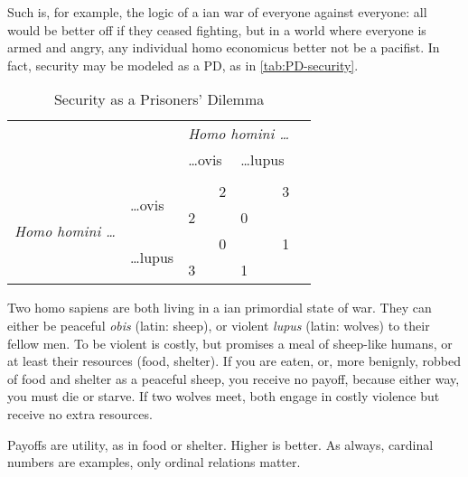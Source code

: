Such is, for example, the logic of a \citeauthor{Hobbes-1651-aa}ian war of everyone against everyone: all would be better off if they ceased fighting, but in a world where everyone is armed and angry, any individual homo economicus better not be a pacifist.
In fact, security may be modeled as a \gls{PD}, as in \autoref{tab:PD-security}.

\begin{table}
	\caption{Security as a Prisoners' Dilemma}
	\label{tab:PD-security}
	\begin{center}
	\begin{tabular}
		{m{1cm}
		m{}
		m{}
		m{}
		m{}}

&
& \multicolumn{2}{c}{\emph{Homo homini \ldots}}
\\


&
&\ldots ovis
& \ldots lupus
\\\\ %

\cline{3-4}


\multicolumn{1}{c}{\multirow{4}{*}{\emph{Homo homini \ldots}}}
& \multirow{2}{2,3cm}{\ldots ovis}
& 	\multicolumn{1}{|r|}{2}
& \multicolumn{1}{r|}{3}
\\


\multicolumn{1}{c}{}
& \multicolumn{1}{c}{}
& \multicolumn{1}{|l|}{2}
& \multicolumn{1}{l|}{0}
\\

\cline{3-4}

\multicolumn{1}{c}{}
& \multirow{2}{2,3cm}{\ldots lupus}
& \multicolumn{1}{|r|}{0}
& \multicolumn{1}{r|}{1}
\\


\multicolumn{1}{c}{}
& \multicolumn{1}{c}{}
& \multicolumn{1}{|l|}{3}
& \multicolumn{1}{l|}{1}
\\

\cline{3-4}
\end{tabular}
\end{center}
\scriptsize{
	Two homo sapiens are both living in a \citeauthor{Hobbes-1651-aa}ian primordial state of war.
	They can either be peaceful \emph{obis} (latin: sheep), or violent \emph{lupus} (latin: wolves) to their fellow men.
	To be violent is costly, but promises a meal of sheep-like humans, or at least their resources (food, shelter).
	If you are eaten, or, more benignly, robbed of food and shelter as a peaceful sheep, you receive no payoff, because either way, you must die or starve.
	If two wolves meet, both engage in costly violence but receive no extra resources.

	Payoffs are utility, as in food or shelter.
	Higher is better.
	As always, cardinal numbers are examples, only ordinal relations matter.}
\end{table}

